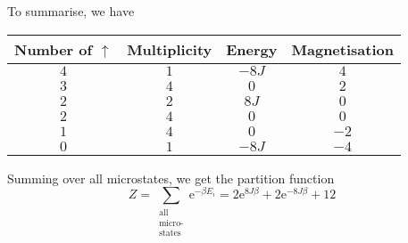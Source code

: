 \documentclass[12pt,english,a4paper]{article}
\renewcommand{\exp}[1]{\mathrm{e}^{#1}}
\begin{document}
To summarise, we have
\begin{table}[H]
    \centering
    \begin{tabular}{cccc}\toprule
        Number of \(\uparrow\) & Multiplicity & Energy & Magnetisation\\ \midrule
        \(4\) & \(1\) & \(-8J\) & \(4\) \\ \midrule
        \(3\) & \(4\) & \(0\) & \(2\) \\ \midrule
        \(2\) & \(2\) & \(8J\) & \(0\) \\ \midrule
        \(2\) & \(4\) & \(0\) & \(0\) \\ \midrule
        \(1\) & \(4\) & \(0\) & \(-2\) \\ \midrule
        \(0\) & \(1\) & \(-8J\) & \(-4\) \\ \bottomrule
    \end{tabular}
\end{table}

Summing over all microstates, we get the partition function
\[
    Z = \sum_{\substack{\text{all}\\ \text{micro-}\\ \text{states}}} \exp{-\beta E_i}
    = 2\exp{8J\beta} + 2\exp{-8J\beta} + 12
\]
\end{document}

